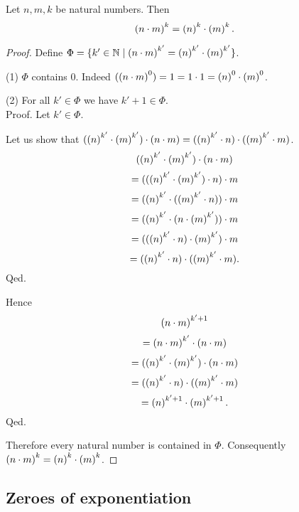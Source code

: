 \documentclass[../arithmetic.tex]{subfiles}
\begin{document}
  \begin{forthel}
    \begin{proposition}
      Let $n, m, k$ be natural numbers.
      Then \[ \left(n \cdot m\right)^{k} = \left(n\right)^{k} \cdot \left(m\right)^{k}. \]
    \end{proposition}
    \begin{proof}
      Define $\Phi = \{ k' \in \mathbb{N} \mid \left(n \cdot m\right)^{k'} =
      \left(n\right)^{k'} \cdot \left(m\right)^{k'} \}$.

      (1) $\Phi$ contains $0$.
      Indeed $(\left(n \cdot m\right)^{0})
        = 1
        = 1 \cdot 1
        = \left(n\right)^{0} \cdot \left(m\right)^{0}$. %

      (2) For all $k' \in \Phi$ we have $k' \plus 1 \in \Phi$. \\
      Proof.
        Let $k' \in \Phi$.

        Let us show that $(\left(n\right)^{k'} \cdot \left(m\right)^{k'}) \cdot (n \cdot m) =
        (\left(n\right)^{k'} \cdot n) \cdot (\left(m\right)^{k'} \cdot m)$.
          \[  (\left(n\right)^{k'} \cdot \left(m\right)^{k'}) \cdot (n \cdot m)       \]
          \[    = ((\left(n\right)^{k'} \cdot \left(m\right)^{k'}) \cdot n) \cdot m   \]
          \[    = (\left(n\right)^{k'} \cdot (\left(m\right)^{k'} \cdot n)) \cdot m   \]
          \[    = (\left(n\right)^{k'} \cdot (n \cdot \left(m\right)^{k'})) \cdot m   \]
          \[    = ((\left(n\right)^{k'} \cdot n) \cdot \left(m\right)^{k'}) \cdot m   \]
          \[    = (\left(n\right)^{k'} \cdot n) \cdot (\left(m\right)^{k'} \cdot m).  \]
        Qed.

        Hence
        \[  \left(n \cdot m\right)^{k' + 1}                          \]
        \[    = \left(n \cdot m\right)^{k'} \cdot (n \cdot m)        \]
        \[    = (\left(n\right)^{k'} \cdot \left(m\right)^{k'}) \cdot (n \cdot m)   \]
        \[    = (\left(n\right)^{k'} \cdot n) \cdot (\left(m\right)^{k'} \cdot m)   \]
        \[    = \left(n\right)^{k' + 1} \cdot \left(m\right)^{k' + 1}.              \]
      Qed.

      Therefore every natural number is contained in $\Phi$.
      Consequently $\left(n \cdot m\right)^{k} = \left(n\right)^{k} \cdot \left(m\right)^{k}$.
    \end{proof}
  \end{forthel}


  \subsection*{Zeroes of exponentiation}
\end{document}
